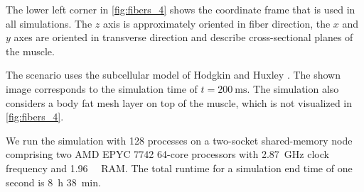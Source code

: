 The lower left corner in \cref{fig:fibers_4} shows the coordinate frame that is used in all simulations. The $z$ axis is approximately  oriented in fiber direction, the $x$ and $y$ axes are oriented in transverse direction and describe cross-sectional planes of the muscle.

The scenario uses the subcellular model of Hodgkin and Huxley \cite{Hodgkin1952}. The shown image corresponds to the simulation time of $t=\SI{200}{\milli\second}$. The simulation also considers a body fat mesh layer on top of the muscle, which is not visualized in \cref{fig:fibers_4}.

We run the simulation with 128 processes on a two-socket shared-memory node comprising two AMD EPYC 7742 64-core processors with \SI{2.87}{\giga\hertz} clock frequency and \SI{1.96}{\tebi\byte} RAM. The total runtime for a simulation end time of one second is \SI{8}{\hour} \SI{38}{\minute}.

